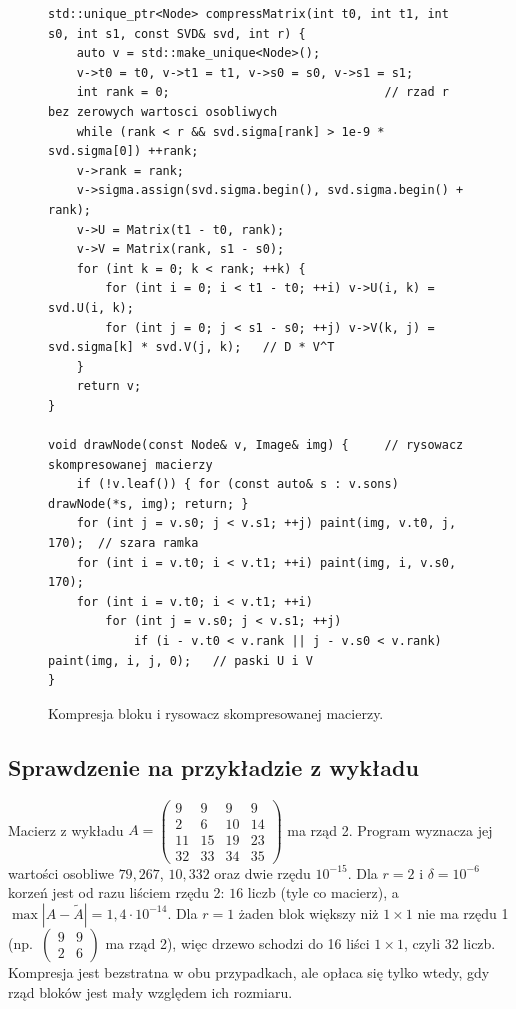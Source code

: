 \documentclass[11pt,a4paper]{article}
\begin{document}
\begin{figure}[H]
\centering
\begin{lstlisting}
std::unique_ptr<Node> compressMatrix(int t0, int t1, int s0, int s1, const SVD& svd, int r) {
    auto v = std::make_unique<Node>();
    v->t0 = t0, v->t1 = t1, v->s0 = s0, v->s1 = s1;
    int rank = 0;                              // rzad r bez zerowych wartosci osobliwych
    while (rank < r && svd.sigma[rank] > 1e-9 * svd.sigma[0]) ++rank;
    v->rank = rank;
    v->sigma.assign(svd.sigma.begin(), svd.sigma.begin() + rank);
    v->U = Matrix(t1 - t0, rank);
    v->V = Matrix(rank, s1 - s0);
    for (int k = 0; k < rank; ++k) {
        for (int i = 0; i < t1 - t0; ++i) v->U(i, k) = svd.U(i, k);
        for (int j = 0; j < s1 - s0; ++j) v->V(k, j) = svd.sigma[k] * svd.V(j, k);   // D * V^T
    }
    return v;
}

void drawNode(const Node& v, Image& img) {     // rysowacz skompresowanej macierzy
    if (!v.leaf()) { for (const auto& s : v.sons) drawNode(*s, img); return; }
    for (int j = v.s0; j < v.s1; ++j) paint(img, v.t0, j, 170);  // szara ramka
    for (int i = v.t0; i < v.t1; ++i) paint(img, i, v.s0, 170);
    for (int i = v.t0; i < v.t1; ++i)
        for (int j = v.s0; j < v.s1; ++j)
            if (i - v.t0 < v.rank || j - v.s0 < v.rank) paint(img, i, j, 0);   // paski U i V
}
\end{lstlisting}
\caption{Kompresja bloku i rysowacz skompresowanej macierzy.}
\end{figure}

\subsection{Sprawdzenie na przykładzie z wykładu}
Macierz z wykładu
$A=\left(\begin{smallmatrix}9&9&9&9\\2&6&10&14\\11&15&19&23\\32&33&34&35\end{smallmatrix}\right)$ ma rząd 2.
Program wyznacza jej wartości osobliwe $79{,}267$, $10{,}332$ oraz dwie rzędu $10^{-15}$. Dla $r=2$ i $\delta=10^{-6}$
korzeń jest od razu liściem rzędu 2: $16$ liczb (tyle co macierz), a $\max|A-\tilde A|=1{,}4\cdot10^{-14}$. Dla
$r=1$ żaden blok większy niż $1\times1$ nie ma rzędu 1 (np.\ $\left(\begin{smallmatrix}9&9\\2&6\end{smallmatrix}\right)$
ma rząd 2), więc drzewo schodzi do 16 liści $1\times1$, czyli 32 liczb. Kompresja jest bezstratna w obu
przypadkach, ale opłaca się tylko wtedy, gdy rząd bloków jest mały względem ich rozmiaru.
\end{document}
